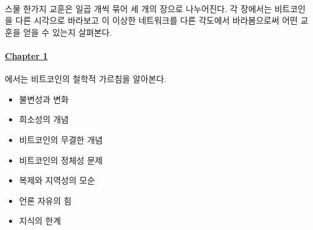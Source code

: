 \paragraph{}
스물 한가지 교훈은 일곱 개씩 묶어 세 개의 장으로 나누어진다. 
각 장에서는 비트코인을 다른 시각으로 바라보고 이 이상한 네트워크를 다른 각도에서
바라봄으로써 어떤 교훈을 얻을 수 있는지 살펴본다.


\paragraph{\hyperref[ch:philosophy]{Chapter 1}}{에서는 비트코인의 철학적 가르침을 알아본다.
	\begin{itemize}
		\item 불변성과 변화
		\item 희소성의 개념
		\item 비트코인의 무결한 개념
		\item 비트코인의 정체성 문제
		\item 복제와 지역성의 모순
		\item 언론 자유의 힘
		\item 지식의 한계
\end{itemize}}


